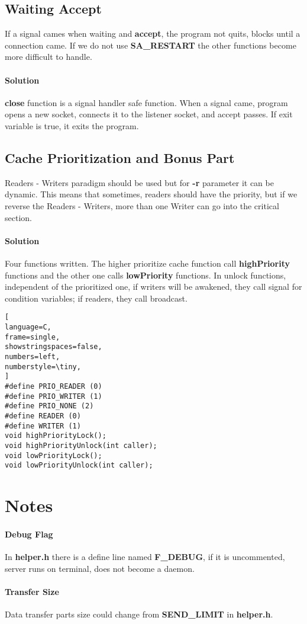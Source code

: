 \documentclass[11pt]{scrartcl} %
\begin{document}
\subsection{Waiting Accept}
If a signal cames when waiting and \textbf{accept}, the program not quits, blocks until a connection came. If we do not use \textbf{SA\_RESTART} the other functions become more difficult to handle.
\paragraph{Solution} \textbf{close} function is a signal handler safe function. When a signal came, program opens a new socket, connects it to the listener socket, and accept passes. If exit variable is true, it exits the program.

\subsection{Cache Prioritization and Bonus Part}
Readers - Writers paradigm should be used but for \textbf{-r} parameter it can be dynamic. This means that sometimes, readers should have the priority, but if we reverse the Readers - Writers, more than one Writer can go into the critical section.
\paragraph{Solution} Four functions written. The higher prioritize cache function call \textbf{highPriority} functions and the other one calls \textbf{lowPriority} functions. In unlock functions, independent of the prioritized one, if writers will be awakened, they call signal for condition variables; if readers, they call broadcast.
\begin{lstlisting}[
language=C,
frame=single,
showstringspaces=false,
numbers=left,
numberstyle=\tiny,
]
#define PRIO_READER (0)
#define PRIO_WRITER (1)
#define PRIO_NONE (2)
#define READER (0)
#define WRITER (1)
void highPriorityLock();
void highPriorityUnlock(int caller);
void lowPriorityLock();
void lowPriorityUnlock(int caller);
\end{lstlisting}

\section{Notes}

\paragraph{Debug Flag}
In \textbf{helper.h} there is a define line named \textbf{F\_DEBUG}, if it is uncommented, server runs on terminal, does not become a daemon.

\paragraph{Transfer Size}
Data transfer parts size could change from \textbf{SEND\_LIMIT} in \textbf{helper.h}.
\end{document}
